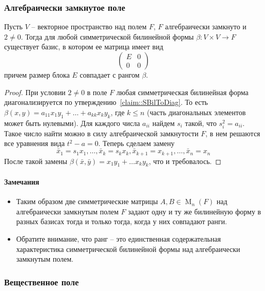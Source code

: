 \subsubsection{Алгебраически замкнутое поле}

\begin{claim}
Пусть $V$ -- векторное пространство над полем $F$, $F$ алгебраически замкнуто и $ 2 \neq 0$. Тогда для любой симметрической билинейной формы $\beta\colon V\times V\to F$ существует базис, в котором ее матрица имеет вид
\[
\begin{pmatrix}
{E}&{0}\\
{0}&{0}
\end{pmatrix}
\]
причем размер блока $E$ совпадает с рангом $\beta$.
\end{claim}
\begin{proof}
При условии $2\neq 0$ в поле $F$ любая симметрическая билинейная форма диагонализируется по утверждению~\ref{claim::SBilToDiag}. То есть $\beta(x,y) = a_{11}x_1 y_1 + \ldots + a_{kk}x_ky_k$, где $k\leqslant n$ (часть диагональных элементов может быть нулевыми). Для каждого числа $a_{ii}$ найдем $s_i$ такой, что $s_i^2 = a_{ii}$. Такое число найти можно в силу алгебраической замкнутости $F$, в нем решаются все уравнения вида $t^2 - a = 0$. Теперь сделаем замену
\[
\bar x_1 = s_1 x_1,\ldots,\bar x_k = s_k x_k, \bar x_{k+1} = x_{k+1},\ldots,\bar x_n = x_n
\]
После такой замены $\beta(\bar x,\bar y) = x_1y_1 + \ldots x_k y_k$, что и требовалось.
\end{proof}

\paragraph{Замечания}
\begin{itemize}
\item Таким образом две симметрические матрицы $A,B\in \operatorname{M}_n(F)$ над алгебраически замкнутым полем $F$ задают одну и ту же билинейную форму в разных базисах тогда и только тогда, когда у них совпадают ранги.

\item Обратите внимание, что ранг -- это единственная содержательная характеристика симметрической билинейной формы над алгебраически замкнутым полем.
\end{itemize}

\subsubsection{Вещественное поле}

